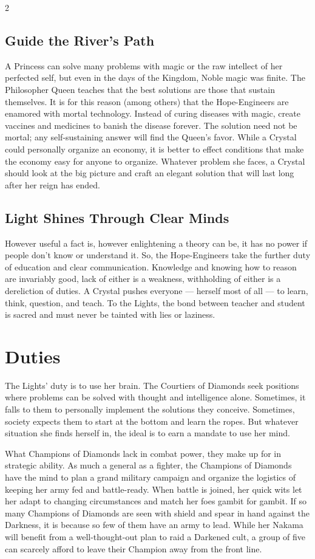 \begin{multicols}{2}
\subsection*{Guide the River's Path}
A Princess can solve many problems with magic or the raw intellect of her perfected self, but even in the days of the Kingdom, Noble magic was finite. The Philosopher Queen teaches that the best solutions are those that sustain themselves. It is for this reason (among others) that the Hope-Engineers are enamored with mortal technology. Instead of curing diseases with magic, create vaccines and medicines to banish the disease forever. The solution need not be mortal; any self-sustaining answer will find the Queen's favor. While a Crystal could personally organize an economy, it is better to effect conditions that make the economy easy for anyone to organize. Whatever problem she faces, a Crystal should look at the big picture and craft an elegant solution that will last long after her reign has ended.

\subsection*{Light Shines Through Clear Minds}
However useful a fact is, however enlightening a theory can be, it has no power if people don't know or understand it. So, the Hope-Engineers take the further duty of education and clear communication. Knowledge and knowing how to reason are invariably good, lack of either is a weakness, withholding of either is a dereliction of duties. A Crystal pushes everyone — herself most of all — to learn, think, question, and teach. To the Lights, the bond between teacher and student is sacred and must never be tainted with lies or laziness. 

\section*{Duties}
The Lights' duty is to use her brain. The Courtiers of Diamonds seek positions where problems can be solved with thought and intelligence alone. Sometimes, it falls to them to personally implement the solutions they conceive. Sometimes, society expects them to start at the bottom and learn the ropes. But whatever situation she finds herself in, the ideal is to earn a mandate to use her mind.

What Champions of Diamonds lack in combat power, they make up for in strategic ability. As much a general as a fighter, the Champions of Diamonds have the mind to plan a grand military campaign and organize the logistics of keeping her army fed and battle-ready. When battle is joined, her quick wits let her adapt to changing circumstances and match her foes gambit for gambit. If so many Champions of Diamonds are seen with shield and spear in hand against the Darkness, it is because so few of them have an army to lead. While her Nakama will benefit from a well-thought-out plan to raid a Darkened cult, a group of five can scarcely afford to leave their Champion away from the front line.


\end{multicols}
